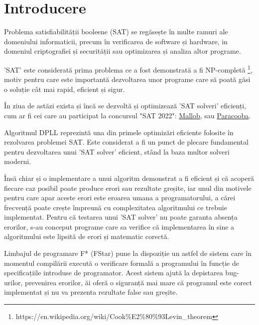 \chapter*{Introducere} 

Problema satisfiabilității booleene (SAT) se regăsește în multe ramuri ale \linebreak domeniului informaticii, precum în verificarea de software și hardware, in domeniul criptografiei și securității sau optimizarea și analiza altor programe.

'SAT' este considerată prima problema ce a fost demonstrată a fi \linebreak NP-completă \footnote{https://en.wikipedia.org/wiki/Cook\%E2\%80\%93Levin\_theorem}, motiv pentru care este importantă dezvoltarea unor programe care să poată găsi o soluție cât mai rapid, eficient și sigur. 

În ziua de astăzi exista și încă se dezvoltă și optimizează 'SAT solveri' eficienți, cum ar fi cei care au participat la concursul "SAT 2022": \href{https://www.dominikschreiber.de/papers/2022-mallob.pdf}{Mallob}, sau \href{https://github.com/maximaximal/Paracooba#readme
}{Paracooba}.

Algoritmul DPLL reprezintă una din primele optimizări eficiente folosite în \linebreak rezolvarea problemei SAT. Este considerat a fi un punct de plecare fundamental pentru \linebreak dezvoltarea unui 'SAT solver' eficient, stând la baza multor solveri moderni.

Însă chiar și o implementare a unui algoritm demonstrat a fi eficient și că acoperă fiecare caz posibil poate produce erori sau rezultate greșite, iar unul din motivele pentru care apar aceste erori este eroarea umana a programatorului, a cărei frecvență poate crește împreună cu complexitatea algoritmului ce trebuie implementat. Pentru că testarea unui 'SAT solver' nu poate garanta absența erorilor, s-au conceput programe care sa verifice că implementarea în sine a algoritmului este lipsită de erori și matematic corectă.

Limbajul de programare F* (FStar) pune la dispoziție un astfel de sistem care în momentul compilării execută o verificare formală a programului în funcție de \linebreak specificațiile introduse de programator. Acest sistem ajută la depistarea bug-urilor, prevenirea erorilor, ăi oferă o siguranță mai mare că programul este corect \linebreak implementat și nu va prezenta rezultate false sau greșite.

